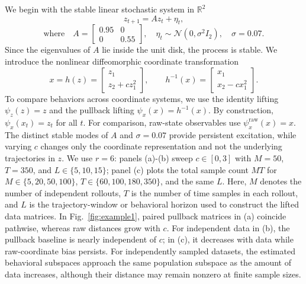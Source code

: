 \documentclass[letterpaper, 10 pt, conference]{ieeeconf}  %
\newcommand{\R}{\mathbb{R}}
\begin{document}
We begin with the stable linear stochastic system in $\R^2$
\begin{equation}
  z_{t+1}=Az_t+\eta_t,
  \label{eq:z_linear_system}
\end{equation}
\[
\text{where}\quad
A=\begin{bmatrix}0.95&0\\0&0.55\end{bmatrix},\quad
  \eta_t\sim\mathcal N(0,\sigma^2I_2),\quad \sigma=0.07.
\]
Since the eigenvalues of $A$ lie inside the unit disk, the process is stable. We introduce the nonlinear diffeomorphic coordinate transformation
\begin{equation}
  x=h(z)=\begin{bmatrix}z_1\\z_2+cz_1^2\end{bmatrix},\qquad
  h^{-1}(x)=\begin{bmatrix}x_1\\x_2-cx_1^2\end{bmatrix}.
  \label{eq:shear_map}
\end{equation}
To compare behaviors across coordinate systems, we use the identity lifting $\psi_z(z)=z$ and the pullback lifting $\psi_x(x)=h^{-1}(x)$. By construction, $\psi_x(x_t)=z_t$ for all $t$. For comparison, raw-state observables use $\psi_x^{\mathrm{raw}}(x)=x$.
The distinct stable modes of $A$ and $\sigma=0.07$ provide persistent excitation, while varying $c$ changes only the coordinate representation and not the underlying trajectories in $z$. We use $r=6$: panels (a)-(b) sweep $c\in[0,3]$ with $M=50$, $T=350$, and $L\in\{5,10,15\}$; panel (c) plots the total sample count $MT$ for $M\in\{5,20,50,100\}$, $T\in\{60,100,180,350\}$, and the same $L$. Here, $M$ denotes the number of independent rollouts, $T$ is the number of time samples in each rollout, and $L$ is the trajectory-window or behavioral horizon used to construct the lifted data matrices.
In Fig.~\ref{fig:example1}, paired pullback matrices in (a) coincide pathwise, whereas raw distances grow with $c$. For independent data in (b), the pullback baseline is nearly independent of $c$; in (c), it decreases with data while raw-coordinate bias persists. For independently sampled datasets, the estimated behavioral subspaces approach the same population subspace as the amount of data increases, although their distance may remain nonzero at finite sample sizes.
\end{document}
